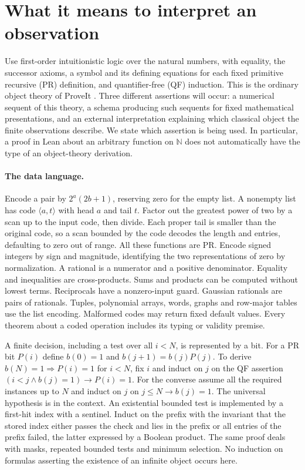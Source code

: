 \section{What it means to interpret an observation}
\label{sec:language}

Use first-order intuitionistic logic over the natural numbers, with equality, the successor axioms, a symbol and its defining equations for each fixed primitive recursive (PR) definition, and quantifier-free (QF) induction. This is the ordinary object theory of ProveIt \cite{target}. Three different assertions will occur:
a numerical sequent of this theory, a schema producing such sequents for fixed mathematical presentations, and an external interpretation explaining which classical object the finite observations describe. We state which assertion is being used. In particular, a proof in Lean about an arbitrary function on $\mathbb N$ does not automatically have the type of an object-theory derivation.

\paragraph{The data language.}
Encode a pair by $2^a(2b+1)$, reserving zero for the empty list. A nonempty list has code $\langle a,t\rangle$ with head $a$ and tail $t$. Factor out the greatest power of two by a scan up to the input code, then divide. Each proper tail is smaller than the original code, so a scan bounded by the code decodes the length and entries, defaulting to zero out of range. All these functions are PR. Encode signed integers by sign and magnitude, identifying the two representations of zero by normalization. A rational is a numerator and a positive denominator. Equality and inequalities are cross-products. Sums and products can be computed without lowest terms. Reciprocals have a nonzero-input guard. Gaussian rationals are pairs of rationals. Tuples, polynomial arrays, words, graphs and row-major tables use the list encoding. Malformed codes may return fixed default values. Every theorem about a coded operation includes its typing or validity premise.

A finite decision, including a test over all $i<N$, is represented by a bit. For a PR bit $P(i)$ define $b(0)=1$ and $b(j+1)=b(j)P(j)$. To derive $b(N)=1\Rightarrow P(i)=1$ for $i<N$, fix $i$ and induct on $j$ on the QF assertion $(i<j\land b(j)=1)\to P(i)=1$. For the converse assume all the required instances up to $N$ and induct on $j$ on $j\le N\to b(j)=1$. The universal hypothesis is in the context. An existential bounded test is implemented by a first-hit index with a sentinel. Induct on the prefix with the invariant that the stored index either passes the check and lies in the prefix or all entries of the prefix failed, the latter expressed by a Boolean product. The same proof deals with masks, repeated bounded tests and minimum selection. No induction on formulas asserting the existence of an infinite object occurs here.

